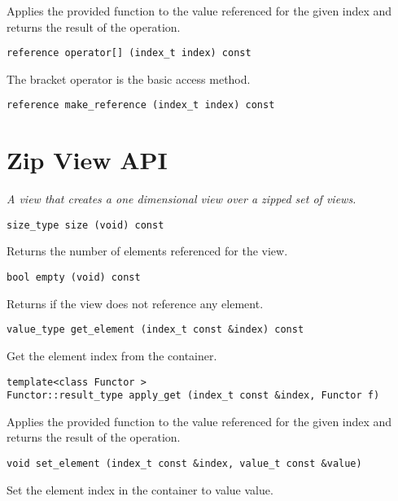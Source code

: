 Applies the provided function to the value referenced for the given index and returns the result of the operation.

\begin{verbatim}
reference operator[] (index_t index) const
\end{verbatim}

The bracket operator is the basic access method.

\begin{verbatim}
reference make_reference (index_t index) const
\end{verbatim}

\pagebreak

\section{Zip View API } \label{sec-zip-vw}

\emph{ A view that creates a one dimensional view over a zipped set of views. }

\begin{verbatim}
size_type size (void) const
\end{verbatim}

Returns the number of elements referenced for the view.

\begin{verbatim}
bool empty (void) const
\end{verbatim}

Returns if the view does not reference any element.

\begin{verbatim}
value_type get_element (index_t const &index) const
\end{verbatim}

Get the element index from the container.

\begin{verbatim}
template<class Functor >
Functor::result_type apply_get (index_t const &index, Functor f)
\end{verbatim}

Applies the provided function to the value referenced for the given index and returns the result of the operation.

\begin{verbatim}
void set_element (index_t const &index, value_t const &value)
\end{verbatim}

Set the element index in the container to value value.


